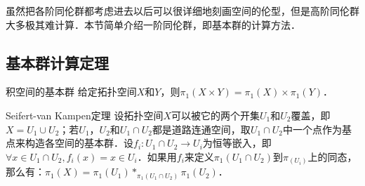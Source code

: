 


虽然把各阶同伦群都考虑进去以后可以很详细地刻画空间的伦型，但是高阶同伦群大多极其难计算．本节简单介绍一阶同伦群，即基本群的计算方法．

\subsection{基本群计算定理}

\begin{theorem}{积空间的基本群}
给定拓扑空间$X$和$Y$，则$\pi_1(X\times Y)=\pi_1(X)\times\pi_1(Y)$．
\end{theorem}

\begin{theorem}{Seifert-van Kampen定理}
设拓扑空间$X$可以被它的两个开集$U_1$和$U_2$覆盖，即$X=U_1\cup U_2$；若$U_1$，$U_2$和$U_1\cap U_2$都是道路连通空间，取$U_1\cap U_2$中一个点作为基点来构造各空间的基本群．设$f_i:U_1\cap U_2\rightarrow U_i$为恒等嵌入，即$\forall x\in U_1\cap U_2, f_i(x)=x\in U_i$．如果用$f_i$来定义$\pi_1(U_1\cap U_2)$到$\pi_(U_i)$上的同态，那么有：$\pi_1(X)=\pi_1(U_1)*_{\pi_1(U_1\cap U_2)}\pi_1(U_2)$．
\end{theorem}

